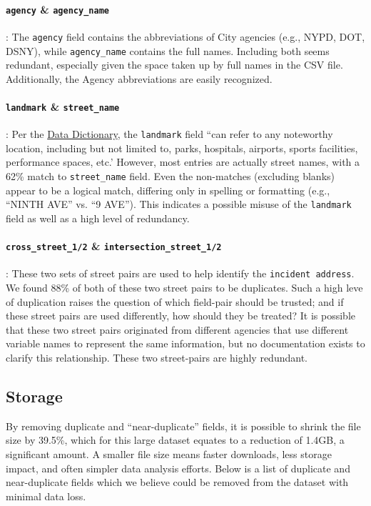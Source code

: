 \documentclass[linenumber]{jdsart}
\begin{document}
\paragraph{\texttt{agency} \& \texttt{agency\_name}}: The \texttt{agency} 
field contains the abbreviations of City agencies (e.g., NYPD, DOT, DSNY), 
while \texttt{agency\_name} contains the full names. Including both seems 
redundant, especially given the space taken up by full names in the 
CSV file. Additionally, the Agency abbreviations are easily recognized.

\paragraph{\texttt{landmark} \& \texttt{street\_name}}: Per the \href{https://data.cityofnewyork.us/api/views/erm2-nwe9/files/b372b884-f86a-453b-ba16-1fe06ce9d212?download=true&filename=311_ServiceRequest_2010-Present_DataDictionary_Updated_2023.xlsx}{Data Dictionary}, the \texttt{landmark} field ``can refer to any 
noteworthy location, including but not limited to, parks, 
hospitals, airports, sports facilities, performance spaces, etc.'  
However, most entries are actually street names, with a 62\% 
match to \texttt{street\_name} field. Even the non\mbox{-}matches (excluding 
blanks) appear to be a logical match, differing only in spelling or formatting 
(e.g., ``NINTH AVE'' vs. ``9 AVE''). This indicates a possible 
misuse of the \texttt{landmark} field as well as a high level of redundancy.

\paragraph{\texttt{cross\_street\_1/2} \& \texttt{intersection\_street\_1/2}}: These 
two sets of street pairs are used to help identify the 
\texttt{incident address}. We found 88\% of both of these two 
street pairs to be duplicates. Such a high leve of duplication 
raises the question of which field\mbox{-}pair should be trusted; 
and if these street pairs are used differently, how should they be treated?
It is possible that these two street pairs originated from different 
agencies that use different variable names to represent the same 
information, but no documentation exists to clarify this 
relationship. These two street\mbox{-}pairs are highly redundant.


\subsection{Storage}
\label{sec:filesize}
By removing duplicate and ``near\mbox{-}duplicate'' fields, it is possible to 
shrink the file size by 39.5\%, which for this large dataset equates to 
a reduction of 1.4GB, a significant amount. A smaller file size 
means faster downloads, less storage impact, and often 
simpler data analysis efforts. Below is a list of duplicate 
and near\mbox{-}duplicate fields which we believe could be
removed from the dataset with minimal data loss. 
\end{document}
